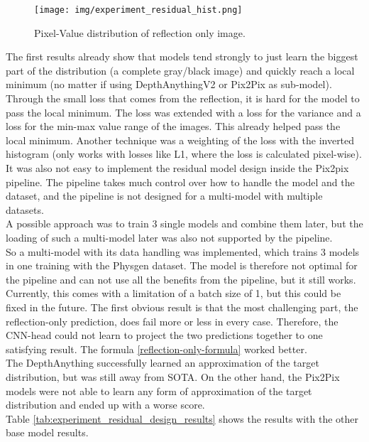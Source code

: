 		\begin{figure}[H]
			\centering
			\texttt{[image: img/experiment\_residual\_hist.png]}
			\caption[Pixel-Value distribution of reflection only image.]{Pixel-Value distribution of reflection only image.}
			\label{fig:experiment_residual_hist}
		\end{figure}
		\FloatBarrier
		\clearpage
		The first results already show that models tend strongly to just learn the biggest part of the distribution (a complete gray/black image) and quickly reach a local minimum (no matter if using DepthAnythingV2 or Pix2Pix as sub-model). Through the small loss that comes from the reflection, it is hard for the model to pass the local minimum. The loss was extended with a loss for the variance and a loss for the min-max value range of the images. This already helped pass the local minimum. Another technique was a weighting of the loss with the inverted histogram (only works with losses like L1, where the loss is calculated pixel-wise).
		\\
		It was also not easy to implement the residual model design inside the Pix2pix pipeline. The pipeline takes much control over how to handle the model and the dataset, and the pipeline is not designed for a multi-model with multiple datasets.\\
		A possible approach was to train 3 single models and combine them later, but the loading of such a multi-model later was also not supported by the pipeline.\\
		So a multi-model with its data handling was implemented, which trains 3 models in one training with the Physgen dataset. The model is therefore not optimal for the pipeline and can not use all the benefits from the pipeline, but it still works. Currently, this comes with a limitation of a batch size of 1, but this could be fixed in the future.
		The first obvious result is that the most challenging part, the reflection-only prediction, does fail more or less in every case. Therefore, the CNN-head could not learn to project the two predictions together to one satisfying result. The formula \ref{reflection-only-formula} worked better.\\
		The DepthAnything successfully learned an approximation of the target distribution, but was still away from SOTA. On the other hand, the Pix2Pix models were not able to learn any form of approximation of the target distribution and ended up with a worse score. \\
		Table \ref{tab:experiment_residual_design_results} shows the results with the other base model results.
